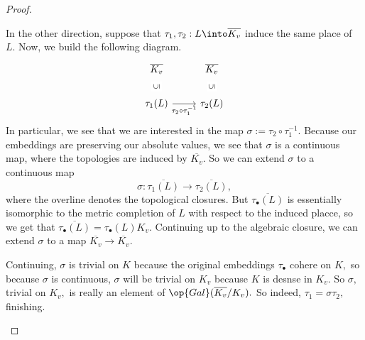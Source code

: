 \documentclass[../notes.tex]{subfiles}
\begin{document}
\begin{proof}
\begin{listalph}
		In the other direction, suppose that $\tau_1,\tau_2:L\into\overline{K_v}$ induce the same place of $L.$ Now, we build the following diagram.
		\[\begin{tikzcd}
			{\overline{K_v}} & {\overline{K_v}} \\
			{\tau_1(L)} & {\tau_2(L)}
			\arrow["{\rotatebox{90}{$\subseteq$}}"{description}, draw=none, from=2-1, to=1-1]
			\arrow["{\rotatebox{90}{$\subseteq$}}"{description}, draw=none, from=2-2, to=1-2]
			\arrow["{\tau_2\circ\tau_1^{-1}}"', from=2-1, to=2-2]
		\end{tikzcd}\]
		In particular, we see that we are interested in the map $\sigma:=\tau_2\circ\tau_1^{-1}.$ Because our embeddings are preserving our absolute values, we see that $\sigma$ is a continuous map, where the topologies are induced by $\overline{K_v}.$ So we can extend $\sigma$ to a continuous map
		\[\sigma:\overline{\tau_1(L)}\to\overline{\tau_2(L)},\]
		where the overline denotes the topological closures. But $\overline{\tau_\bullet(L)}$ is essentially isomorphic to the metric completion of $L$ with respect to the induced placce, so we get that $\overline{\tau_\bullet(L)}=\tau_\bullet(L)K_v.$ Continuing up to the algebraic closure, we can extend $\sigma$ to a map $\overline{K_v}\to\overline{K_v}.$

		Continuing, $\sigma$ is trivial on $K$ because the original embeddings $\tau_\bullet$ cohere on $K,$ so because $\sigma$ is continuous, $\sigma$ will be trivial on $K_v$ because $K$ is desnse in $K_v.$ So $\sigma,$ trivial on $K_v,$ is really an element of $\op{Gal}(\overline{K_v}/K_v).$ So indeed, $\tau_1=\sigma\tau_2,$ finishing.
		\qedhere
	\end{listalph}
\end{proof}
\end{document}

